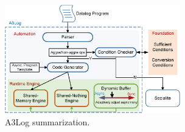 




\begin{figure}[t]
    \centerline{\includegraphics[width=3in]{fig/intro.eps}}
    \caption{A3Log summarization.}
    \label{fig:intro}
\end{figure}


